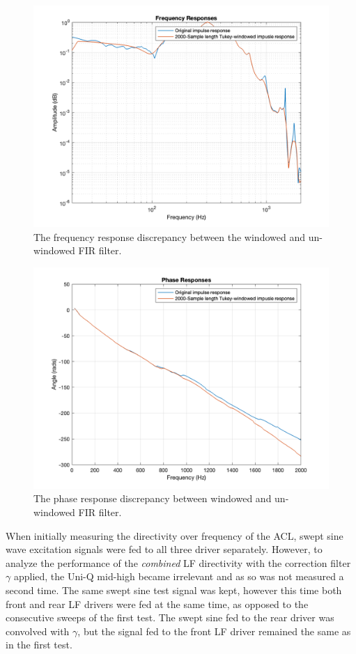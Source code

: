 \documentclass{report}
\begin{document}
            \begin{figure}[H]
                \centering
                \includegraphics[width=0.7\linewidth]{figs/tukeyFrequency.png}
                \caption{The frequency response discrepancy between the windowed and un-windowed FIR filter.}
                \label{tukeyFrequency}
            \end{figure}

            \begin{figure}[H]
                \centering
                \includegraphics[width=0.7\linewidth]{figs/tukeyPhase.png}
                \caption{The phase response discrepancy between windowed and un-windowed FIR filter.}
                \label{tukeyPhase}
            \end{figure}


            When initially measuring the directivity over frequency of the ACL, swept sine wave excitation signals were fed to all three driver separately.
            However, to analyze the performance of the \textit{combined} LF directivity with the correction filter $\gamma$ applied, the Uni-Q mid-high became irrelevant and as so was not measured a second time.
            The same swept sine test signal was kept, however this time both front and rear LF drivers were fed at the same time, as opposed to the consecutive sweeps of the first test.
            The swept sine fed to the rear driver was convolved with $\gamma$, but the signal fed to the front LF driver remained the same as in the first test.
            
\end{document}
